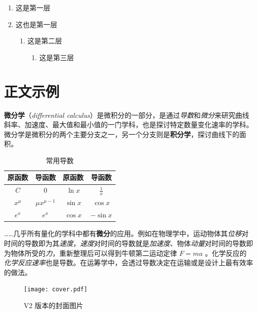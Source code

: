 \documentclass[
  10pt,
  twoside,
  openany,
  b5paper, %
  colorscheme = basic %
]{qyxf-book}
\begin{document}
\begin{enumerate}
  \item 这是第一层
  \item 这也是第一层
  \begin{enumerate}
    \item 这是第二层
    \begin{enumerate}
      \item 这是第三层
    \end{enumerate}
  \end{enumerate}
\end{enumerate}

\section{正文示例}

\textbf{微分学}（\emph{differential calculus}）是微积分的一部分，是通过\emph{导数}和\emph{微分}来研究曲线斜率、加速度、最大值和最小值的一门学科，也是探讨特定数量变化速率的学科。微分学是微积分的两个主要分支之一，另一个分支则是\textbf{积分学}，探讨曲线下的面积。


\begin{table}[htbp]
  \centering
  \caption{常用导数}
  \begin{tabular}{cccc}
    \toprule
    \textbf{原函数} & \textbf{导函数}   & \textbf{原函数} & \textbf{导函数} \\
    \midrule
    $C$             & $0$               & $\ln x$         & $\frac{1}{x}$   \\
    $x^\mu$         & $\mu x^{\mu - 1}$ & $\sin x$        & $\cos x$        \\
    $e^x$           & $e^x$             & $\cos x$        & $-\sin x$       \\
    \bottomrule
  \end{tabular}
\end{table}

……几乎所有量化的学科中都有\textbf{微分}的应用。例如在物理学中，运动物体其\emph{位移}对时间的导数即为其\emph{速度}，\emph{速度}对时间的导数就是\emph{加速度}、物体\emph{动量}对时间的导数即为物体所受的\emph{力}，重新整理后可以得到牛顿第二运动定律 $F=ma$ 。化学反应的\emph{化学反应速率}也是导数。在运筹学中，会透过导数决定在运输或是设计上最有效率的做法。

\begin{figure}[htbp]
  \centering
  \texttt{[image: cover.pdf]}
  \caption{V2 版本的封面图片}
  \label{fig:qyxf-logo}
\end{figure}
\end{document}
